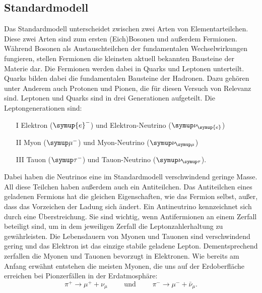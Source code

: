 \documentclass[
  bibliography=totoc,     %
  captions=tableheading,  %
  titlepage=firstiscover, %
]{scrartcl}
\begin{document}
    \subsection{Standardmodell}
    \label{sec:standardmodell}
  Das Standardmodell unterscheidet zwischen zwei Arten von Elementarteilchen.
  Diese zwei Arten sind zum ersten (Eich)Bosonen und außerdem Fermionen.
  Während Bosonen als Austauschteilchen der fundamentalen Wechselwirkungen fungieren,
  stellen Fermionen die kleinsten aktuell bekannten Bausteine der Materie dar.
  Die Fermionen werden dabei in Quarks und Leptonen unterteilt. Quarks bilden
  dabei die fundamentalen Bausteine der Hadronen. Dazu gehören unter Anderem
  auch Protonen und Pionen, die für diesen Versuch von Relevanz sind.
  Leptonen und Quarks sind in drei Generationen aufgeteilt. Die
  Leptongenerationen sind:
  \begin{itemize}
    \item[I] Elektron ($\symup{e}^-$) und Elektron-Neutrino ($\symup\nu_{\symup{e}}$)
    \item[II] Myon ($\symup\mu^-$) und Myon-Neutrino ($\symup\nu_{\symup\mu}$)
    \item[III] Tauon ($\symup\tau^-$) und Tauon-Neutrino ($\symup\nu_{\symup\tau}$).
  \end{itemize}
  Dabei haben die Neutrinos eine im Standardmodell verschwindend geringe Masse.\\
  All diese Teilchen haben außerdem auch ein Antiteilchen. Das Antiteilchen
  eines geladenen Fermions hat die gleichen Eigenschaften, wie das Fermion
  selbst, außer, dass das Vorzeichen der Ladung sich ändert.
  Ein Antineutrino kennzeichnet sich durch eine Überstreichung. Sie sind
  wichtig, wenn Antifermionen an einem Zerfall beteiligt sind, um in dem
  jeweiligen Zerfall die Leptonzahlerhaltung zu gewährleisten.
  Die Lebensdauern von Myonen und Tauonen sind verschwindend gering und das
  Elektron ist das einzige stabile geladene Lepton. Dementsprechend zerfallen
  die Myonen und Tauonen bevorzugt in Elektronen. Wie bereits am Anfang erwähnt
  entstehen die meisten Myonen, die uns auf der Erdoberfläche erreichen bei
  Pionzerfällen in der Erdatmosphäre:
  \begin{equation*}
    \pi^+ \to \mu^+ + \nu_{\mu} \qquad \text{ und } \qquad \pi^- \to \mu^- + \bar{\nu}_{\mu} .
    \label{pionzerfälle}
  \end{equation*}
\end{document}
